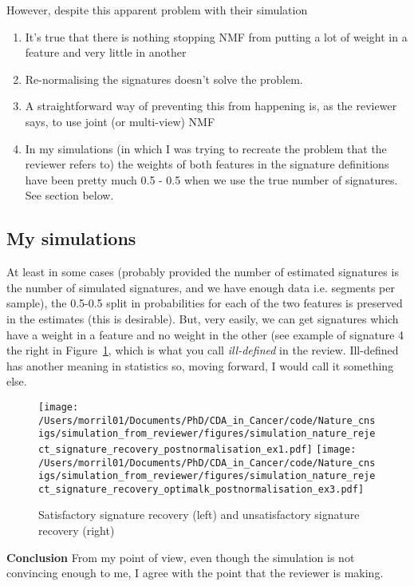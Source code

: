 \documentclass[11pt,a4paper,roman]{article}
\begin{document}
However, despite this apparent problem with their simulation
\begin{enumerate}
\item It's true that there is nothing stopping NMF from putting a lot of weight in a feature and very little in another
\item Re-normalising the signatures doesn't solve the problem.
\item A straightforward way of preventing this from happening is, as the reviewer says, to use joint (or multi-view) NMF
\item In my simulations (in which I was trying to recreate the problem that the reviewer refers to) the weights of both features in the signature definitions have been pretty much 0.5 - 0.5 when we use the true number of signatures. See section below.
\end{enumerate}

\subsection{My simulations}

At least in some cases (probably provided the number of estimated signatures is the number of simulated signatures, and we have enough data i.e. segments per sample), the 0.5-0.5 split in probabilities for each of the two features is preserved in the estimates (this is desirable). But, very easily, we can get signatures which have a weight in a feature and no weight in the other (see example of signature 4 the right in Figure~\ref{mysim}, which is what you call \emph{ill-defined} in the review. Ill-defined has another meaning in statistics so, moving forward, I would call it something else.

\begin{figure}[h]
\centering
\texttt{[image: /Users/morril01/Documents/PhD/CDA\_in\_Cancer/code/Nature\_cnsigs/simulation\_from\_reviewer/figures/simulation\_nature\_reject\_signature\_recovery\_postnormalisation\_ex1.pdf]}
\texttt{[image: /Users/morril01/Documents/PhD/CDA\_in\_Cancer/code/Nature\_cnsigs/simulation\_from\_reviewer/figures/simulation\_nature\_reject\_signature\_recovery\_optimalk\_postnormalisation\_ex3.pdf]}
\caption{Satisfactory signature recovery (left) and unsatisfactory signature recovery (right)\label{mysim}}
\end{figure}

\textbf{Conclusion} From my point of view, even though the simulation is not convincing enough to me, I agree with the point that the reviewer is making.
\end{document}
